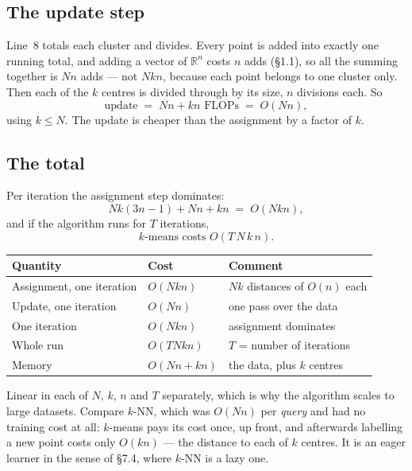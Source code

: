 \documentclass[11pt]{article}
\theoremstyle{plain}
\theoremstyle{definition}
\theoremstyle{remark}
\newcommand{\R}{\mathbb{R}}
\begin{document}
\subsection{The update step}
Line~8 totals each cluster and divides. Every point is added into exactly one
running total, and adding a vector of $\R^{n}$ costs $n$ adds (\S1.1), so all
the summing together is $Nn$ adds --- not $Nkn$, because each point belongs to
one cluster only. Then each of the $k$ centres is divided through by its size,
$n$ divisions each. So
\[
  \text{update} \;=\; Nn + kn \text{ FLOPs} \;=\; O(Nn) ,
\]
using $k\le N$. The update is cheaper than the assignment by a factor of $k$.

\subsection{The total}
Per iteration the assignment step dominates:
\[
  Nk(3n-1) + Nn + kn \;=\; O(Nkn) ,
\]
and if the algorithm runs for $T$ iterations,
\[
  \boxed{\;\text{$k$-means costs } O(T\,N\,k\,n) . \;}
\]

\begin{center}
\renewcommand{\arraystretch}{1.35}
\begin{tabular}{@{}l l l@{}}
\toprule
\textbf{Quantity} & \textbf{Cost} & \textbf{Comment} \\
\midrule
Assignment, one iteration & $O(Nkn)$   & $Nk$ distances of $O(n)$ each \\
Update, one iteration     & $O(Nn)$    & one pass over the data \\
One iteration             & $O(Nkn)$   & assignment dominates \\
Whole run                 & $O(TNkn)$  & $T$ = number of iterations \\
Memory                    & $O(Nn+kn)$ & the data, plus $k$ centres \\
\bottomrule
\end{tabular}
\end{center}

\noindent Linear in each of $N$, $k$, $n$ and $T$ separately, which is why the
algorithm scales to large datasets. Compare $k$-NN, which was $O(Nn)$ per
\emph{query} and had no training cost at all: $k$-means pays its cost once, up
front, and afterwards labelling a new point costs only $O(kn)$ --- the distance
to each of $k$ centres. It is an eager learner in the sense of \S7.4, where
$k$-NN is a lazy one.
\end{document}
